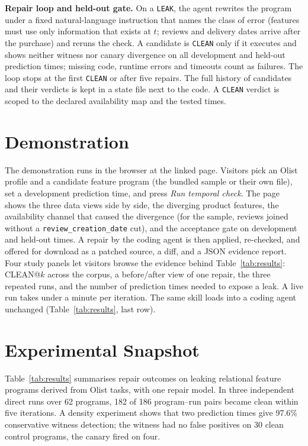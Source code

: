 \documentclass[letterpaper]{article} %
\begin{document}
\textbf{Repair loop and held-out gate.}
On a \texttt{LEAK}, the agent rewrites the program under a fixed
natural-language instruction that names the class of error (features must
use only information that exists at $t$; reviews and delivery dates arrive
after the purchase) and reruns the check. A candidate is \texttt{CLEAN} only
if it executes and shows neither witness nor canary divergence on all
development and held-out prediction times; missing code, runtime errors and
timeouts count as failures. The loop stops at the first \texttt{CLEAN} or
after five repairs. The full history of candidates and their verdicts is
kept in a state file next to the code. A \texttt{CLEAN} verdict is scoped to
the declared availability map and the tested times.

\section{Demonstration}

The demonstration runs in the browser at the linked page. Visitors pick an
Olist profile and a candidate feature program (the bundled sample or their
own file), set a development prediction time, and press \emph{Run temporal
check}. The page shows the three data views side by side, the diverging
product features, the availability channel that caused the divergence (for
the sample, reviews joined without a \texttt{review\_creation\_date} cut),
and the acceptance gate on development and held-out times. A repair by the
coding agent is then applied, re-checked, and offered for download as a
patched source, a diff, and a JSON evidence report. Four study panels let
visitors browse the evidence behind Table~\ref{tab:results}: CLEAN@$k$ across
the corpus, a before/after view of one repair, the three repeated runs, and
the number of prediction times needed to expose a leak. A live run takes
under a minute per iteration. The same skill loads into a coding agent
unchanged (Table~\ref{tab:results}, last row).

\section{Experimental Snapshot}

Table~\ref{tab:results} summarises repair outcomes on leaking relational
feature programs derived from Olist tasks, with one repair model. In three
independent direct runs over 62 programs, 182 of 186 program--run pairs
became clean within five iterations. A density experiment shows that two
prediction times give 97.6\% conservative witness detection; the witness had
no false positives on 30 clean control programs, the canary fired on four.
\end{document}
